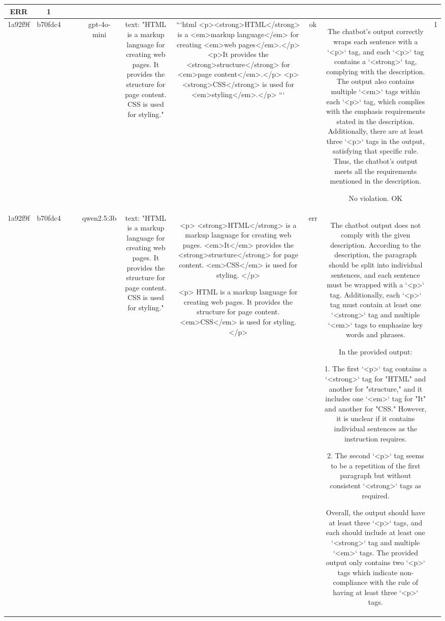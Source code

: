\begin{table}[h!]
\begin{tabular}{|c|c|c|c|c|c|c|c|c|c|}
ERR & 1\\
\hline
1a92f9f & b70fdc4 &  &  & gpt-4o-mini & text: "HTML is a markup language for creating web pages. It provides the structure for page content. CSS is used for styling." & ```html
<p><strong>HTML</strong> is a <em>markup language</em> for creating <em>web pages</em>.</p>
<p>It provides the <strong>structure</strong> for <em>page content</em>.</p>
<p><strong>CSS</strong> is used for <em>styling</em>.</p>
``` & ok & The chatbot's output correctly wraps each sentence with a `<p>` tag, and each `<p>` tag contains a `<strong>` tag, complying with the description. The output also contains multiple `<em>` tags within each `<p>` tag, which complies with the emphasis requirements stated in the description. Additionally, there are at least three `<p>` tags in the output, satisfying that specific rule. Thus, the chatbot's output meets all the requirements mentioned in the description.

No violation.
OK & 1\\
\hline
1a92f9f & b70fdc4 &  &  & qwen2.5:3b & text: "HTML is a markup language for creating web pages. It provides the structure for page content. CSS is used for styling." & <p>
  <strong>HTML</strong> is a markup language for creating web pages. <em>It</em> provides the <strong>structure</strong> for page content. <em>CSS</em> is used for styling.
</p>

<p>
  HTML is a markup language for creating web pages. It provides the structure for page content. <em>CSS</em> is used for styling.
</p> & err & The chatbot output does not comply with the given description. According to the description, the paragraph should be split into individual sentences, and each sentence must be wrapped with a `<p>` tag. Additionally, each `<p>` tag must contain at least one `<strong>` tag and multiple `<em>` tags to emphasize key words and phrases. 

In the provided output:

1. The first `<p>` tag contains a `<strong>` tag for "HTML" and another for "structure," and it includes one `<em>` tag for "It" and another for "CSS." However, it is unclear if it contains individual sentences as the instruction requires.
   
2. The second `<p>` tag seems to be a repetition of the first paragraph but without consistent `<strong>` tags as required.
   
Overall, the output should have at least three `<p>` tags, and each should include at least one `<strong>` tag and multiple `<em>` tags. The provided output only contains two `<p>` tags which indicate non-compliance with the rule of having at least three `<p>` tags. 


\end{tabular}
\end{table}

